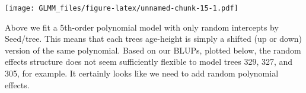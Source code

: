 \documentclass[
]{book}
\newenvironment{Shaded}{\begin{snugshade}}{\end{snugshade}}
\newcommand{\AttributeTok}[1]{\textcolor[rgb]{0.77,0.63,0.00}{#1}}
\newcommand{\ConstantTok}[1]{\textcolor[rgb]{0.00,0.00,0.00}{#1}}
\newcommand{\DecValTok}[1]{\textcolor[rgb]{0.00,0.00,0.81}{#1}}
\newcommand{\FloatTok}[1]{\textcolor[rgb]{0.00,0.00,0.81}{#1}}
\newcommand{\FunctionTok}[1]{\textcolor[rgb]{0.00,0.00,0.00}{#1}}
\newcommand{\NormalTok}[1]{#1}
\newcommand{\OtherTok}[1]{\textcolor[rgb]{0.56,0.35,0.01}{#1}}
\newcommand{\SpecialCharTok}[1]{\textcolor[rgb]{0.00,0.00,0.00}{#1}}
\newcommand{\StringTok}[1]{\textcolor[rgb]{0.31,0.60,0.02}{#1}}
\begin{document}
\begin{Shaded}
\end{Shaded}

\texttt{[image: GLMM\_files/figure-latex/unnamed-chunk-15-1.pdf]}

Above we fit a 5th-order polynomial model with only random intercepts by Seed/tree. This means that each trees age-height is simply a shifted (up or down) version of the same polynomial. Based on our BLUPs, plotted below, the random effects structure does not seem sufficiently flexible to model trees 329, 327, and 305, for example. It certainly looks like we need to add random polynomial effects.
\end{document}
